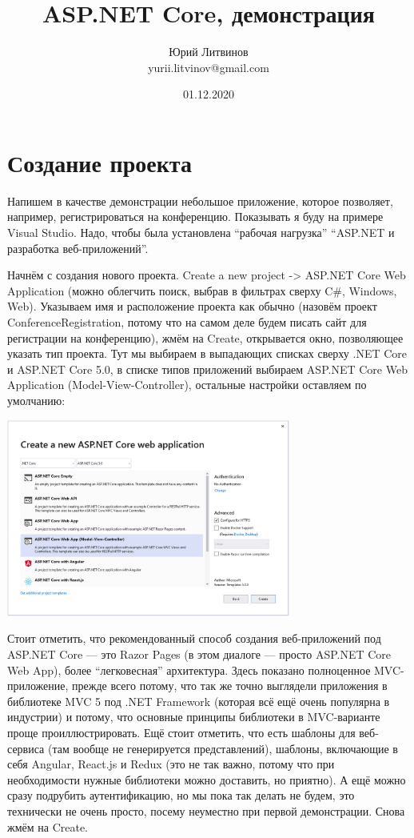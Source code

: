 \documentclass[a5paper]{article}
\title{ASP.NET Core, демонстрация}
\author{Юрий Литвинов\\\small{yurii.litvinov@gmail.com}}
\date{01.12.2020}
\begin{document}
\maketitle
\thispagestyle{empty}

\section{Создание проекта}

Напишем в качестве демонстрации небольшое приложение, которое позволяет, например, регистрироваться на конференцию. Показывать я буду на примере Visual Studio. Надо, чтобы была установлена ``рабочая нагрузка'' ``ASP.NET и разработка веб-приложений''.

Начнём с создания нового проекта. Create a new project -> ASP.NET Core Web Application (можно облегчить поиск, выбрав в фильтрах сверху C\#, Windows, Web).
Указываем имя и расположение проекта как обычно (назовём проект ConferenceRegistration, потому что на самом деле будем писать сайт для регистрации на конференцию), жмём на Create, открывается окно, позволяющее указать тип проекта. Тут мы выбираем в выпадающих списках сверху .NET Core и ASP.NET Core 5.0, в списке типов приложений выбираем ASP.NET Core Web Application (Model-View-Controller), остальные настройки оставляем по умолчанию:

\begin{center}
    \includegraphics[width=0.7\textwidth]{projectCreation.png}
\end{center}

Стоит отметить, что рекомендованный способ создания веб-приложений под ASP.NET Core --- это Razor Pages (в этом диалоге --- просто ASP.NET Core Web App), более ``легковесная'' архитектура. Здесь показано полноценное MVC-приложение,
прежде всего потому, что так же точно выглядели приложения в библиотеке MVC 5 под .NET Framework (которая всё ещё очень популярна в индустрии) и потому, что основные принципы библиотеки в MVC-варианте проще проиллюстрировать.
Ещё стоит отметить, что есть шаблоны для веб-сервиса (там вообще не генерируется представлений), шаблоны, включающие в себя Angular, React.js и Redux (это не так важно, потому что при необходимости нужные библиотеки можно доставить, но приятно). А ещё можно сразу подрубить аутентификацию, но мы пока так делать не будем, это технически не очень просто, посему неуместно при первой демонстрации. Снова жмём на Create.
\end{document}

